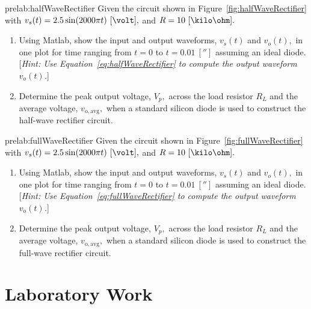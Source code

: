 \begin{prelab}{prelab:halfWaveRectifier}
Given the circuit shown in Figure~\ref{fig:halfWaveRectifier} with $v_s(t) = 2.5\sin(2000\pi t)~[\volt],$ and $R = 10~[\kilo\ohm].$ 
      \begin{enumerate}
      \item Using Matlab, show the input and output waveforms, $v_s(t)$ and $v_o(t),$ in one plot for time ranging from $t=0$ to $t=0.01~[\second]$ assuming an ideal diode. [\emph{Hint: Use Equation~\eqref{eq:halfWaveRectifier} to compute the output waveform $v_o(t)$.}]
        
      \item Determine the peak output voltage, $V_p,$ across the load resistor $R_L$ and the average voltage, $v_{\mathrm{o,avg}},$ when a standard silicon diode is used to construct the half-wave rectifier circuit.           
        \end{enumerate}
      \end{prelab}
      
\begin{prelab}{prelab:fullWaveRectifier}
Given the circuit shown in Figure~\ref{fig:fullWaveRectifier} with $v_s(t) = 2.5\sin(2000\pi t)~[\volt],$ and $R = 10~[\kilo\ohm].$ 
      \begin{enumerate}
      \item Using Matlab, show the input and output waveforms, $v_s(t)$ and $v_o(t),$ in one plot for time ranging from $t=0$ to $t=0.01~[\second]$ assuming an ideal diode. [\emph{Hint: Use Equation~\eqref{eq:fullWaveRectifier} to compute the output waveform $v_o(t)$.}]
        
      \item Determine the peak output voltage, $V_p,$ across the load resistor $R_L$ and the average voltage, $v_{\mathrm{o,avg}},$ when a standard silicon diode is used to construct the full-wave rectifier circuit. 
        \end{enumerate}
        
\end{prelab}


\section{Laboratory Work}
